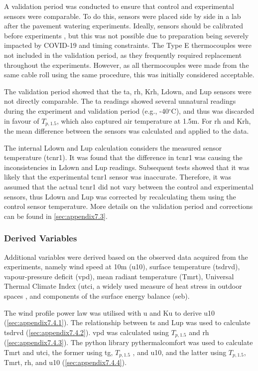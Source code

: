 \documentclass[final,3p,times,authoryear]{elsarticle}
\begin{document}
A validation period was conducted to ensure that control and experimental sensors were
comparable. To do this, sensors were placed side by side in a lab after the pavement
watering experiments. Ideally, sensors should be calibrated before experiments \citep{Phillips2001}, but this was not possible due to preparation being severely impacted by COVID-19 and timing constraints. The Type E thermocouples
were not included in the validation period, as they frequently required replacement
throughout the experiments. However, as all thermocouples were made from the same
cable roll using the same procedure, this was initially considered acceptable.

The validation period showed that the \gls{ta}, \gls{rh}, \gls{Krh}, \gls{Ldown}, and \gls{Lup} sensors were not directly comparable. The \gls{ta} readings showed several unnatural readings during the experiment and validation period (e.g., -40$^{\circ}$C), and thus was discarded in favour of $T_{p,1.5}$, which also captured air temperature at 1.5m. For \gls{rh} and \gls{Krh}, the mean difference between the sensors was calculated and applied to the data. 

The internal \gls{Ldown} and \gls{Lup} calculation considers the measured sensor temperature (\gls{tcnr1}). It was found that the difference in \gls{tcnr1} was causing the inconsistencies in \gls{Ldown} and \gls{Lup} readings. Subsequent tests showed that it was likely that the experimental \gls{tcnr1} sensor was inaccurate. Therefore, it was assumed that the actual \gls{tcnr1} did not vary between the control and experimental sensors, thus \gls{Ldown} and \gls{Lup} was corrected by recalculating them using the control sensor temperature. More details on the validation period and corrections can be found in \ref{sec:appendix7.3}.

\subsubsection{Derived Variables}\label{sec:methods2.2.2}

Additional variables were derived based on the observed data acquired from the
experiments, namely wind speed at 10m (\gls{u10}), surface temperature (\gls{tsdrvd}), vapour-pressure deficit (\gls{vpd}), mean radiant temperature (\gls{Tmrt}), Universal Thermal Climate Index (\gls{utci}, a widely used measure of heat stress in outdoor spaces \citep{Zare2018a}, and components of the surface energy balance (\gls{seb}).

The wind profile power law \citep{Manwell2010,Banuelos-Ruedas2010} was
utilised with \gls{u} and \gls{Ku}  to derive \gls{u10} (\ref{sec:appendix7.4.1}). The relationship between \gls{ts} and \gls{Lup} \citep{Oke2017} was used to calculate \gls{tsdrvd} (\ref{sec:appendix7.4.2}). \gls{vpd} was calculated using $T_{p,1.5}$ and \gls{rh} \citep{Allen1998,McMahon2013} (\ref{sec:appendix7.4.3}). The python library pythermalcomfort \citep{Tartarini2020} was used to calculate \gls{Tmrt} and \gls{utci}, the former using \gls{tg}, $T_{p,1.5}$ , and \gls{u10}, and the latter using $T_{p,1.5}$, \gls{Tmrt}, \gls{rh}, and \gls{u10} (\ref{sec:appendix7.4.4}).
\end{document}
